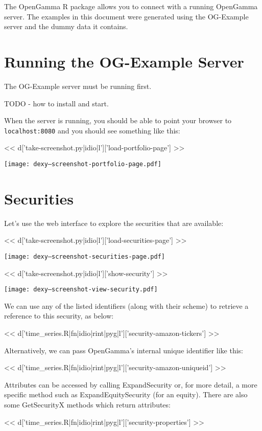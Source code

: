 \documentclass[a4paper]{amsart}
\begin{document}
The OpenGamma R package allows you to connect with a running OpenGamma server. The examples in this document were generated using the OG-Example server and the dummy data it contains.

\section{Running the OG-Example Server}

The OG-Example server must be running first.

TODO - how to install and start.

When the server is running, you should be able to point your browser to \verb|localhost:8080| and you should see something like this:

<< d['take-screenshot.py|idio|l']['load-portfolio-page'] >>

\texttt{[image: dexy--screenshot-portfolio-page.pdf]}

\section{Securities}

Let's use the web interface to explore the securities that are available:

<< d['take-screenshot.py|idio|l']['load-securities-page'] >>

\texttt{[image: dexy--screenshot-securities-page.pdf]}

<< d['take-screenshot.py|idio|l']['show-security'] >>

\texttt{[image: dexy--screenshot-view-security.pdf]}

We can use any of the listed identifiers (along with their scheme) to retrieve a reference to this security, as below:

<< d['time_series.R|fn|idio|rint|pyg|l']['security-amazon-tickers'] >>

Alternatively, we can pass OpenGamma's internal unique identifier like this:

<< d['time_series.R|fn|idio|rint|pyg|l']['security-amazon-uniqueid'] >>

Attributes can be accessed by calling ExpandSecurity or, for more detail, a more specific method such as ExpandEquitySecurity (for an equity). There are also some GetSecurityX methods which return attributes:

<< d['time_series.R|fn|idio|rint|pyg|l']['security-properties'] >>
\end{document}
